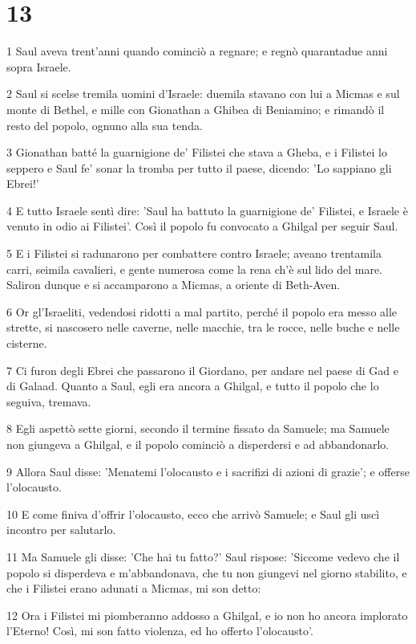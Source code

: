 \chapter{13}

\par 1 Saul aveva trent'anni quando cominciò a regnare; e regnò quarantadue anni sopra Israele.
\par 2 Saul si scelse tremila uomini d'Israele: duemila stavano con lui a Micmas e sul monte di Bethel, e mille con Gionathan a Ghibea di Beniamino; e rimandò il resto del popolo, ognuno alla sua tenda.
\par 3 Gionathan batté la guarnigione de' Filistei che stava a Gheba, e i Filistei lo seppero e Saul fe' sonar la tromba per tutto il paese, dicendo: 'Lo sappiano gli Ebrei!'
\par 4 E tutto Israele sentì dire: 'Saul ha battuto la guarnigione de' Filistei, e Israele è venuto in odio ai Filistei'. Così il popolo fu convocato a Ghilgal per seguir Saul.
\par 5 E i Filistei si radunarono per combattere contro Israele; aveano trentamila carri, seimila cavalieri, e gente numerosa come la rena ch'è sul lido del mare. Saliron dunque e si accamparono a Micmas, a oriente di Beth-Aven.
\par 6 Or gl'Israeliti, vedendosi ridotti a mal partito, perché il popolo era messo alle strette, si nascosero nelle caverne, nelle macchie, tra le rocce, nelle buche e nelle cisterne.
\par 7 Ci furon degli Ebrei che passarono il Giordano, per andare nel paese di Gad e di Galaad. Quanto a Saul, egli era ancora a Ghilgal, e tutto il popolo che lo seguiva, tremava.
\par 8 Egli aspettò sette giorni, secondo il termine fissato da Samuele; ma Samuele non giungeva a Ghilgal, e il popolo cominciò a disperdersi e ad abbandonarlo.
\par 9 Allora Saul disse: 'Menatemi l'olocausto e i sacrifizi di azioni di grazie'; e offerse l'olocausto.
\par 10 E come finiva d'offrir l'olocausto, ecco che arrivò Samuele; e Saul gli uscì incontro per salutarlo.
\par 11 Ma Samuele gli disse: 'Che hai tu fatto?' Saul rispose: 'Siccome vedevo che il popolo si disperdeva e m'abbandonava, che tu non giungevi nel giorno stabilito, e che i Filistei erano adunati a Micmas, mi son detto:
\par 12 Ora i Filistei mi piomberanno addosso a Ghilgal, e io non ho ancora implorato l'Eterno! Così, mi son fatto violenza, ed ho offerto l'olocausto'.
